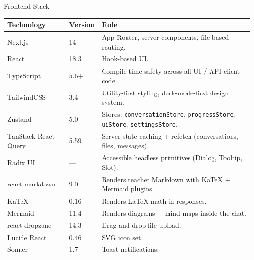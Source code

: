 \documentclass[aspectratio=169, 10pt]{beamer}
\begin{document}
\begin{frame}{Frontend Stack}
  \tiny
  \renewcommand{\arraystretch}{1.15}
  \begin{tabular}{p{2.6cm} p{1.3cm} p{8.5cm}}
    \toprule
    \rowcolor{eduBlue!20}\textbf{Technology} & \textbf{Version} & \textbf{Role} \\
    \midrule
    Next.js                  & 14   & App Router, server components, file-based routing. \\
    React                    & 18.3 & Hook-based UI. \\
    TypeScript               & 5.6+ & Compile-time safety across all UI / API client code. \\
    TailwindCSS              & 3.4  & Utility-first styling, dark-mode-first design system. \\
    Zustand                  & 5.0  & Stores: \texttt{conversationStore}, \texttt{progressStore}, \texttt{uiStore}, \texttt{settingsStore}. \\
    TanStack React Query     & 5.59 & Server-state caching + refetch (conversations, files, messages). \\
    Radix UI                 & ---  & Accessible headless primitives (Dialog, Tooltip, Slot). \\
    react-markdown           & 9.0  & Renders teacher Markdown with KaTeX + Mermaid plugins. \\
    KaTeX                    & 0.16 & Renders LaTeX math in responses. \\
    Mermaid                  & 11.4 & Renders diagrams + mind maps inside the chat. \\
    react-dropzone           & 14.3 & Drag-and-drop file upload. \\
    Lucide React             & 0.46 & SVG icon set. \\
    Sonner                   & 1.7  & Toast notifications. \\
    \bottomrule
  \end{tabular}
\end{frame}
\end{document}
